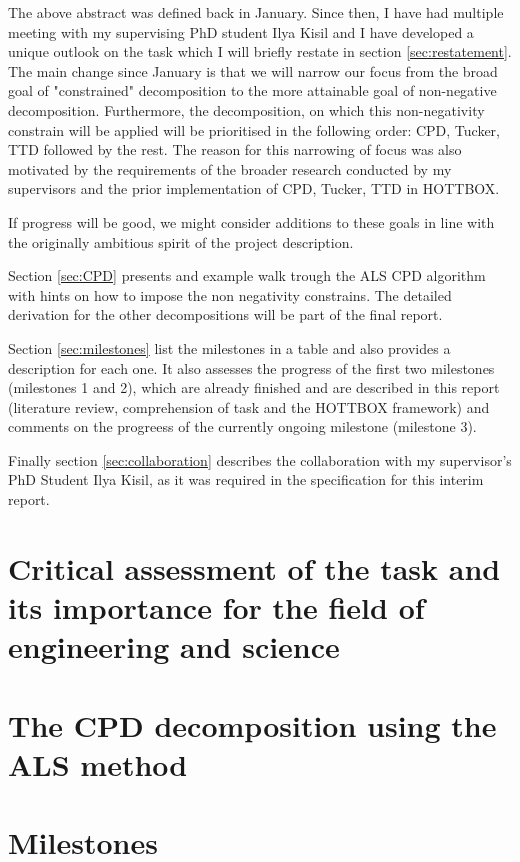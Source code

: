 \documentclass{article}
\begin{document}
The above abstract was defined back in January. Since then, I have had multiple meeting with my supervising PhD student Ilya Kisil and I have developed a unique outlook on the task which I will briefly restate in section \ref{sec:restatement}. The main change since January is that we will narrow our focus from the broad goal of "constrained" decomposition to the more attainable goal of non-negative decomposition. Furthermore, the decomposition, on which this non-negativity constrain will be applied will be prioritised in the following order: CPD, Tucker, TTD followed by the rest. The reason for this narrowing of focus was also motivated by the requirements of the broader research conducted by my supervisors and the prior implementation of CPD, Tucker, TTD in HOTTBOX. 

If progress will be good, we might consider additions to these goals in line with the originally ambitious spirit of the project description.

Section \ref{sec:CPD} presents and example walk trough the ALS CPD algorithm with hints on how to impose the non negativity constrains. The detailed derivation for the other decompositions will be part of the final report.

Section \ref{sec:milestones} list the milestones in a table and also provides a description for each one. It also assesses the progress of the first two milestones (milestones 1 and 2), which are already finished and are described in this report (literature review, comprehension of task and the HOTTBOX framework) and comments on the progreess of the currently ongoing milestone (milestone 3).

Finally section \ref{sec:collaboration} describes the collaboration with my supervisor's PhD Student Ilya Kisil, as it was required in the specification for this interim report.

\section{Critical assessment of the task and its importance for the field of engineering and science\label{sec:restatement}}

\section{The CPD decomposition using the ALS method \label{sec:CPD}}

\section{Milestones \label{sec:milestones}}
\end{document}
